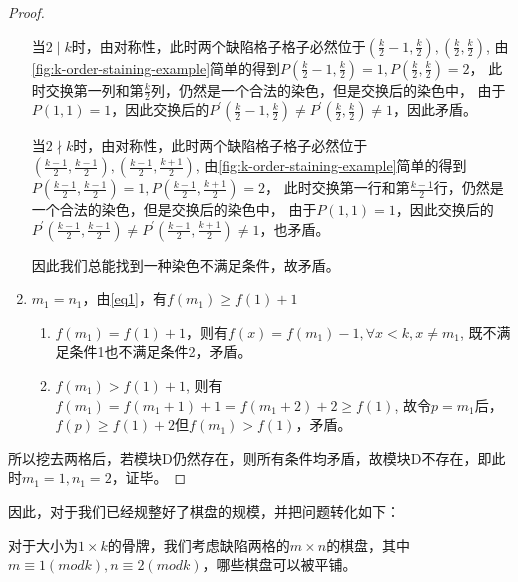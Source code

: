 \begin{proof}
\begin{enumerate}
              当$2 \mid k$时，由对称性，此时两个缺陷格子格子必然位于$(\frac{k}{2} - 1,\frac{k}{2}), (\frac{k}{2},\frac{k}{2})$,
              由\ref{fig:k-order-staining-example}简单的得到$P(\frac{k}{2} - 1,\frac{k}{2}) = 1, P(\frac{k}{2},\frac{k}{2}) = 2$，
              此时交换第一列和第$\frac{k}{2}$列，仍然是一个合法的染色，但是交换后的染色中，
              由于$P(1, 1) = 1$，因此交换后的$P^{'}(\frac{k}{2} - 1,\frac{k}{2}) \neq P^{'}(\frac{k}{2},\frac{k}{2}) \neq 1$，因此矛盾。

              当$2 \nmid k$时，由对称性，此时两个缺陷格子格子必然位于$(\frac{k - 1}{2},\frac{k - 1}{2}), (\frac{k - 1}{2},\frac{k + 1}{2})$,
              由\ref{fig:k-order-staining-example}简单的得到$P(\frac{k - 1}{2},\frac{k - 1}{2}) = 1, P(\frac{k - 1}{2},\frac{k + 1}{2}) = 2$，
              此时交换第一行和第$\frac{k - 1}{2}$行，仍然是一个合法的染色，但是交换后的染色中，
              由于$P(1, 1) = 1$，因此交换后的$P^{'}(\frac{k - 1}{2},\frac{k - 1}{2}) \neq P^{'}(\frac{k - 1}{2},\frac{k + 1}{2}) \neq 1$，也矛盾。
              
              因此我们总能找到一种染色不满足条件，故矛盾。
        \item $m_1 = n_1$，由\ref{eq1}，有$f(m_1) \ge f(1) + 1$
              \begin{enumerate}
                  \item $f(m_1) = f(1) + 1$，则有$f(x) = f(m_1) - 1, \forall x < k, x \neq m_1$, 既不满足条件1也不满足条件2，矛盾。
                  \item $f(m_1) > f(1) + 1$, 则有$f(m_1) = f(m_1 + 1) + 1 = f(m_1 + 2) + 2 \ge f(1)$, 故令$p = m_1$后，$f(p) \ge f(1) + 2$但$f(m_1) > f(1)$，矛盾。
              \end{enumerate}
    \end{enumerate}

    所以挖去两格后，若模块D仍然存在，则所有条件均矛盾，故模块D不存在，即此时$m_1 = 1, n_1 = 2$，证毕。
\end{proof}

因此，对于我们已经规整好了棋盘的规模，并把问题转化如下：

对于大小为$1 \times k$的骨牌，我们考虑缺陷两格的$m \times n$的棋盘，其中$m \equiv 1 (mod k), n \equiv 2 (mod k)$，哪些棋盘可以被平铺。

\clearpage